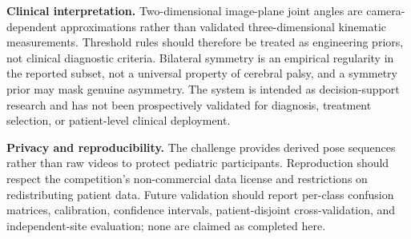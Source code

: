 \noindent\textbf{Clinical interpretation.}
Two-dimensional image-plane joint angles are camera-dependent approximations rather than validated three-dimensional kinematic measurements. Threshold rules should therefore be treated as engineering priors, not clinical diagnostic criteria. Bilateral symmetry is an empirical regularity in the reported subset, not a universal property of cerebral palsy, and a symmetry prior may mask genuine asymmetry. The system is intended as decision-support research and has not been prospectively validated for diagnosis, treatment selection, or patient-level clinical deployment.

\noindent\textbf{Privacy and reproducibility.}
The challenge provides derived pose sequences rather than raw videos to protect pediatric participants. Reproduction should respect the competition's non-commercial data license and restrictions on redistributing patient data. Future validation should report per-class confusion matrices, calibration, confidence intervals, patient-disjoint cross-validation, and independent-site evaluation; none are claimed as completed here.
